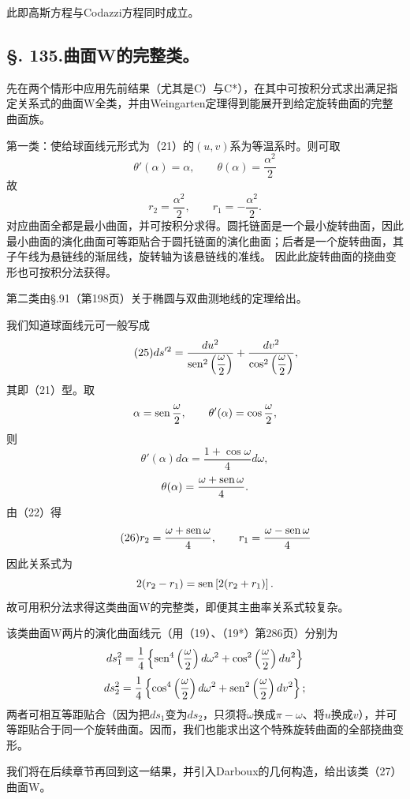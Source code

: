 此即高斯方程与Codazzi方程同时成立。

\subsection*{\S. 135.\quad 曲面W的完整类。}

先在两个情形中应用先前结果（尤其是C）与C*），在其中可按积分式求出满足指定关系式的曲面W全类，并由Weingarten定理得到能展开到给定旋转曲面的完整曲面族。

第一类：使给球面线元形式为（21）的\((u,v)\)系为等温系时。则可取
\[
 \theta'(\alpha)=\alpha,
 \qquad
 \theta(\alpha)=\frac{\alpha^2}{2}
\]
故
\[
 r_2=\frac{\alpha^2}{2},
 \qquad
 r_1=-\frac{\alpha^2}{2}.
\]
对应曲面全都是最小曲面，并可按积分求得。圆托链面是一个最小旋转曲面，因此最小曲面的演化曲面可等距贴合于圆托链面的演化曲面；后者是一个旋转曲面，其子午线为悬链线的渐屈线，旋转轴为该悬链线的准线。
因此此旋转曲面的挠曲变形也可按积分法获得。

第二类由\S.91（第198页）关于椭圆与双曲测地线的定理给出。

我们知道球面线元可一般写成
\begin{equation}\tag{25}
 ds'^2=\frac{du^2}{\operatorname{sen}^2\left(\dfrac\omega2\right)}+\frac{dv^2}{\cos^2\left(\dfrac\omega2\right)},
\end{equation}
其即（21）型。取
\[
 \alpha=\operatorname{sen}\frac\omega2,
 \qquad
 \theta'(\alpha)=\cos\frac\omega2,
\]
则
\[
 \theta'(\alpha)d\alpha=\frac{1+\cos\omega}{4}d\omega,
\]
\[
 \theta(\alpha)=\frac{\omega+\operatorname{sen}\omega}{4}.
\]
由（22）得
\begin{equation}\tag{26}
 r_2=\frac{\omega+\operatorname{sen}\omega}{4},
 \qquad
 r_1=\frac{\omega-\operatorname{sen}\omega}{4}
\end{equation}
因此关系式为
\[
 2(r_2-r_1)=\operatorname{sen}\left[2(r_2+r_1)\right].
\]
故可用积分法求得这类曲面W的完整类，即便其主曲率关系式较复杂。

该类曲面W两片的演化曲面线元（用（19）、（19*）第286页）分别为
\[
 ds_1^2=\frac14\left\{\operatorname{sen}^4\left(\frac\omega2\right)d\omega^2+\cos^2\left(\frac\omega2\right)du^2\right\}
\]
\[
 ds_2^2=\frac14\left\{\cos^4\left(\frac\omega2\right)d\omega^2+\operatorname{sen}^2\left(\frac\omega2\right)dv^2\right\};
\]
两者可相互等距贴合（因为把\(ds_1\)变为\(ds_2\)，只须将\(\omega\)换成\(\pi-\omega\)、将\(u\)换成\(v\)），并可等距贴合于同一个旋转曲面。因而，我们也能求出这个特殊旋转曲面的全部挠曲变形。

我们将在后续章节再回到这一结果，并引入Darboux的几何构造，给出该类（27）曲面W。

